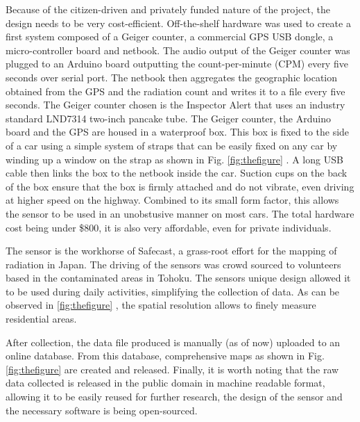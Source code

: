 \documentclass[11pt]{article}
\begin{document}
Because of the citizen-driven and privately funded nature of the project, the
design needs to be very cost-efficient. Off-the-shelf hardware was used to
create a first system composed of a Geiger counter, a commercial GPS USB
dongle, a micro-controller board and netbook. The audio output of the Geiger
counter was plugged to an Arduino board outputting the count-per-minute (CPM)
every five seconds over serial port. The netbook then aggregates the geographic
location obtained from the GPS and the radiation count and writes it to a file
every five seconds. The Geiger counter chosen is the Inspector Alert
\cite{inspector} that uses an industry standard \cite{radiological} LND7314
two-inch pancake tube. The Geiger counter, the Arduino board and the GPS are
housed in a waterproof box. This box is fixed to the side of a car using a
simple system of straps that can be easily fixed on any car by winding up a
window on the strap as shown in Fig.  \ref{fig:thefigure} .
A long USB cable then links the box to the netbook inside the car. Suction cups
on the back of the box ensure that the box is firmly attached and do not
vibrate, even driving at higher speed on the highway. Combined to its small
form factor, this allows the sensor to be used in an unobstusive manner on most
cars. The total hardware cost being under \$800, it is also very affordable,
even for private individuals.

The sensor is the workhorse of Safecast\cite{safecast}, a grass-root effort
for the mapping of radiation in Japan. The driving of the sensors was crowd
sourced to volunteers based in the contaminated areas in Tohoku. The sensors
unique design allowed it to be used during daily activities, simplifying the
collection of data. As can be observed in \ref{fig:thefigure}
, the spatial resolution allows to finely measure
residential areas.

After collection, the data file produced is manually (as of now) uploaded to an
online database. From this database, comprehensive maps as shown in Fig.
\ref{fig:thefigure}  are created and released. Finally, it
is worth noting that the raw data collected is released in the public domain in
machine readable format, allowing it to be easily reused for further research,
the design of the sensor and the necessary software is being open-sourced.
\end{document}
